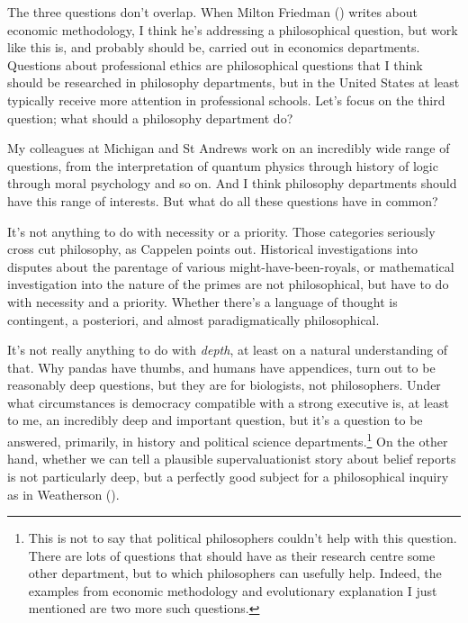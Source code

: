 \documentclass[
  11pt,
  letterpaper,
  DIV=11,
  numbers=noendperiod,
  twoside]{scrartcl}
\begin{document}
The three questions don't overlap. When Milton Friedman
() writes about economic methodology, I
think he's addressing a philosophical question, but work like this is,
and probably should be, carried out in economics departments. Questions
about professional ethics are philosophical questions that I think
should be researched in philosophy departments, but in the United States
at least typically receive more attention in professional schools. Let's
focus on the third question; what should a philosophy department do?

My colleagues at Michigan and St Andrews work on an incredibly wide
range of questions, from the interpretation of quantum physics through
history of logic through moral psychology and so on. And I think
philosophy departments should have this range of interests. But what do
all these questions have in common?

It's not anything to do with necessity or a priority. Those categories
seriously cross cut philosophy, as Cappelen points out. Historical
investigations into disputes about the parentage of various
might-have-been-royals, or mathematical investigation into the nature of
the primes are not philosophical, but have to do with necessity and a
priority. Whether there's a language of thought is contingent, a
posteriori, and almost paradigmatically philosophical.

It's not really anything to do with \emph{depth}, at least on a natural
understanding of that. Why pandas have thumbs, and humans have
appendices, turn out to be reasonably deep questions, but they are for
biologists, not philosophers. Under what circumstances is democracy
compatible with a strong executive is, at least to me, an incredibly
deep and important question, but it's a question to be answered,
primarily, in history and political science departments.\footnote{This
  is not to say that political philosophers couldn't help with this
  question. There are lots of questions that should have as their
  research centre some other department, but to which philosophers can
  usefully help. Indeed, the examples from economic methodology and
  evolutionary explanation I just mentioned are two more such questions.}
On the other hand, whether we can tell a plausible supervaluationist
story about belief reports is not particularly deep, but a perfectly
good subject for a philosophical inquiry as in Weatherson
().
\end{document}
